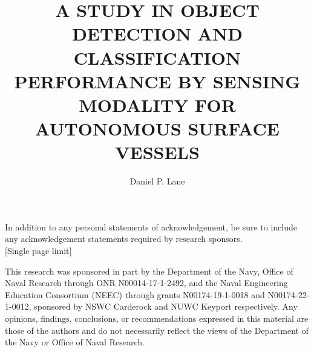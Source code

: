 \documentclass{erauthesis}
\title{A STUDY IN OBJECT DETECTION AND CLASSIFICATION
PERFORMANCE BY SENSING MODALITY FOR AUTONOMOUS
SURFACE VESSELS} %
\author{Daniel P. Lane}
\begin{document}
\frontmatter

\maketitle

\makesignature

\begin{acknowledgements}

    \raggedright In addition to any personal statements of acknowledgement, be sure to include any acknowledgement statements required by research sponsors.\\{[Single page limit]} 

    \raggedright This research was sponsored in part by the Department of the Navy, Office of Naval Research through ONR N00014-17-1-2492, and the Naval Engineering Education Consortium (NEEC) through grants N00174-19-1-0018 and N00174-22-1-0012, sponsored by NSWC Carderock and NUWC Keyport respectively. Any opinions, findings, conclusions, or recommendations expressed in this material are those of the authors and do not necessarily reflect the views of the Department of the Navy or Office of Naval Research.
\end{acknowledgements}
\end{document}

